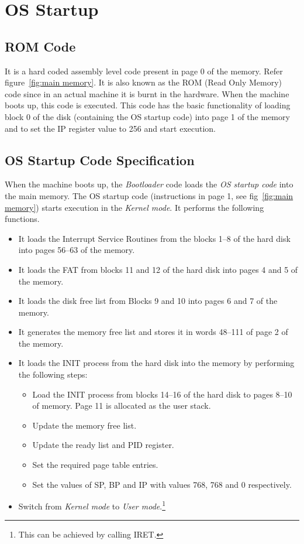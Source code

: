 \documentclass[11pt]{report}
\begin{document}
\chapter{OS Startup}
\label{chp:osstartup}

\section{ROM Code}
\label{lbl:romcode}
It is a hard coded assembly level code present in page 0 of the memory. Refer figure~\ref{fig:main memory}.
It is also known as the ROM (Read Only Memory) code since in an actual machine it is burnt in the hardware. When the machine boots up, this code is executed. This code has the basic functionality of loading block 0 of the disk (containing the OS startup code) into page 1 of the memory and to set the IP register value to 256 and start execution.

\section{OS Startup Code Specification}
\label{lbl:oscode}
When the machine boots up, the \textit{Bootloader} code loads the \textit{OS startup code} into the main memory. The OS startup code (instructions in page 1, see fig~\ref{fig:main memory}) starts execution in the \textit{Kernel mode}. It performs the following functions.
\begin{itemize}
	\item It loads the Interrupt Service Routines from the blocks 1--8 of the hard disk into pages 56--63 of the memory.
	\item It loads the FAT from blocks 11 and 12 of the hard disk into pages 4 and 5 of the memory.
	\item It loads the disk free list from Blocks 9 and 10 into pages 6 and 7 of the memory.
	\item It generates the memory free list and stores it in words 48--111 of page 2 of the memory.
	\item It loads the INIT process from the hard disk into the memory by performing the following steps:
	\begin{itemize}
		\item Load the INIT process from blocks 14--16 of the hard disk to pages 8--10 of memory. Page 11 is allocated as the user stack.
		\item Update the memory free list.
		\item Update the ready list and PID register.
		\item Set the required page table entries.
		\item Set the values of SP, BP and IP with values 768, 768 and 0 respectively.
	\end{itemize}
	\item Switch from \textit{Kernel mode} to \textit{User mode}.\footnote{This can be achieved by calling IRET.}
\end{itemize}
\end{document}
